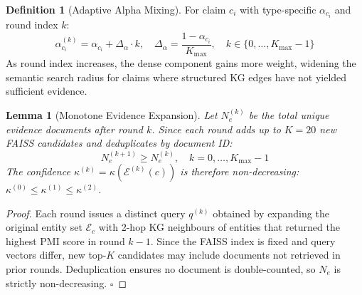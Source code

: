 \documentclass[12pt,a4paper]{article}
\theoremstyle{definition}
\newtheorem{definition}{Definition}[section]
\theoremstyle{plain}
\newtheorem{lemma}[theorem]{Lemma}
\theoremstyle{remark}
\begin{document}
\begin{definition}[Adaptive Alpha Mixing]
\label{def:adaptive_alpha}
For claim $c_i$ with type-specific $\alpha_{c_i}$ and round index $k$:
\[
  \alpha^{(k)}_{c_i} = \alpha_{c_i} + \Delta_\alpha \cdot k, \quad
  \Delta_\alpha = \frac{1 - \alpha_{c_i}}{K_{\max}},\quad
  k \in \{0,\ldots,K_{\max}-1\}
\]
As round index increases, the dense component gains more weight, widening 
the semantic search radius for claims where structured KG edges have not 
yielded sufficient evidence.
\end{definition}

\begin{lemma}[Monotone Evidence Expansion]
\label{lem:monotone_expansion}
Let $N_e^{(k)}$ be the total unique evidence documents after round $k$. 
Since each round adds up to $K = 20$ new FAISS candidates and deduplicates 
by document ID:
\[
  N_e^{(k+1)} \ge N_e^{(k)}, \quad k = 0,\ldots,K_{\max}-1
\]
The confidence $\kappa^{(k)} = \kappa(\mathcal{E}^{(k)}(c))$ is therefore 
non-decreasing: $\kappa^{(0)} \le \kappa^{(1)} \le \kappa^{(2)}$.
\end{lemma}

\begin{proof}
Each round issues a distinct query $q^{(k)}$ obtained by expanding the 
original entity set $\mathcal{E}_c$ with 2-hop KG neighbours of entities 
that returned the highest PMI score in round $k-1$. Since the FAISS index 
is fixed and query vectors differ, new top-$K$ candidates may include 
documents not retrieved in prior rounds. Deduplication ensures no document 
is double-counted, so $N_e$ is strictly non-decreasing. $\square$
\end{proof}
\end{document}
